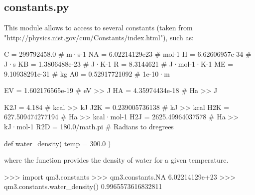 \normalsize
\subsection[constants]{constants.py}
This module allows to access to several constants (taken from "http://physics.nist.gov/cuu/Constants/index.html"), such as:

\begin{pyglist}[language=python,fvset={frame=single}]
C   = 299792458.0      # m·s-1
NA  = 6.02214129e23    # mol-1
H   = 6.62606957e-34   # J·s
KB  = 1.3806488e-23    # J·K-1
R   = 8.3144621        # J·mol-1·K-1
ME  = 9.10938291e-31   # kg
A0  = 0.52917721092    # 1e-10·m

EV  = 1.602176565e-19  # eV >> J
HA  = 4.35974434e-18   # Ha >> J

K2J = 4.184            # kcal >> kJ
J2K = 0.239005736138   # kJ >> kcal
H2K = 627.509474277194 # Ha >> kcal·mol-1
H2J = 2625.49964037578 # Ha >> kJ·mol-1
R2D = 180.0/math.pi    # Radians to dregrees

def water_density( temp = 300.0 )
\end{pyglist}

where the function  provides the density of water for a given temperature.

\footnotesize
\begin{pyglist}[language=python,fvset={frame=single}]
>>> import qm3.constants
>>> qm3.constants.NA
6.02214129e+23
>>> qm3.constants.water_density()
0.9965573616832811
\end{pyglist}
